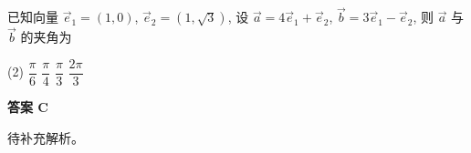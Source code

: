 \begin{choice}[source={2025合肥高三二检}, topic={向量的夹角}]
已知向量 $\vec{e}_1=(1,0)$, $\vec{e}_2=(1,\sqrt{3})$, 设 $\vec{a}=4\vec{e}_1+\vec{e}_2$, $\vec{b}=3\vec{e}_1-\vec{e}_2$, 则 $\vec{a}$ 与 $\vec{b}$ 的夹角为
\begin{tasks}(2)
	\task $\dfrac{\pi}{6}$
	\task $\dfrac{\pi}{4}$
	\task $\dfrac{\pi}{3}$
	\task $\dfrac{2\pi}{3}$
\end{tasks}
\end{choice}
\begin{choice-sol}
\textbf{答案 C}

待补充解析。
\end{choice-sol}
